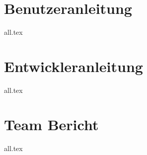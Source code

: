 













\tableofcontents




\chapter{Benutzeranleitung}
{all.tex}

\chapter{Entwickleranleitung}
{all.tex}

\chapter{Team Bericht}
{all.tex}



